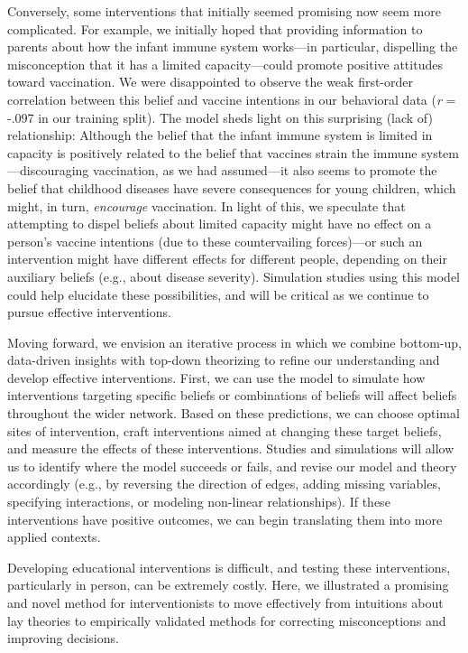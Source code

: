 \documentclass[10pt, letterpaper]{article}
\begin{document}
Conversely, some interventions that initially seemed promising now seem
more complicated. For example, we initially hoped that providing
information to parents about how the infant immune system works---in
particular, dispelling the misconception that it has a limited
capacity---could promote positive attitudes toward vaccination. We were
disappointed to observe the weak first-order correlation between this
belief and vaccine intentions in our behavioral data (\emph{r} = -.097
in our training split). The model sheds light on this surprising (lack
of) relationship: Although the belief that the infant immune system is
limited in capacity is positively related to the belief that vaccines
strain the immune system---discouraging vaccination, as we had
assumed---it also seems to promote the belief that childhood diseases
have severe consequences for young children, which might, in turn,
\emph{encourage} vaccination. In light of this, we speculate that
attempting to dispel beliefs about limited capacity might have no effect
on a person's vaccine intentions (due to these countervailing
forces)---or such an intervention might have different effects for
different people, depending on their auxiliary beliefs (e.g., about
disease severity). Simulation studies using this model could help
elucidate these possibilities, and will be critical as we continue to
pursue effective interventions.

Moving forward, we envision an iterative process in which we combine
bottom-up, data-driven insights with top-down theorizing to refine our
understanding and develop effective interventions. First, we can use the
model to simulate how interventions targeting specific beliefs or
combinations of beliefs will affect beliefs throughout the wider
network. Based on these predictions, we can choose optimal sites of
intervention, craft interventions aimed at changing these target
beliefs, and measure the effects of these interventions. Studies and
simulations will allow us to identify where the model succeeds or fails,
and revise our model and theory accordingly (e.g., by reversing the
direction of edges, adding missing variables, specifying interactions,
or modeling non-linear relationships). If these interventions have
positive outcomes, we can begin translating them into more applied
contexts.

Developing educational interventions is difficult, and testing these
interventions, particularly in person, can be extremely costly. Here, we
illustrated a promising and novel method for interventionists to move
effectively from intuitions about lay theories to empirically validated
methods for correcting misconceptions and improving decisions.
\end{document}
